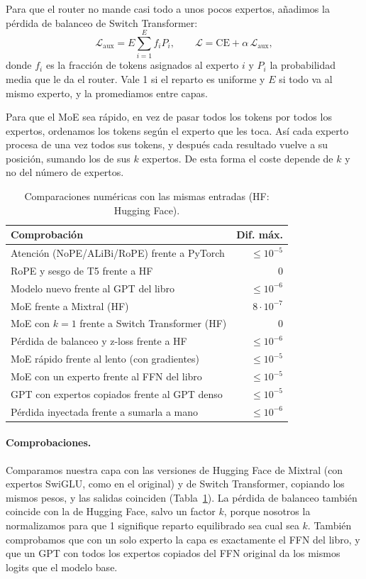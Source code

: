 \documentclass[11pt]{article}
\begin{document}
Para que el router no mande casi todo a unos pocos expertos, añadimos la pérdida de balanceo de Switch Transformer:
\begin{equation}
\mathcal{L}_{\mathrm{aux}} = E \textstyle\sum_{i=1}^{E} f_i P_i,\qquad \mathcal{L} = \mathrm{CE} + \alpha\,\mathcal{L}_{\mathrm{aux}},
\end{equation}
donde $f_i$ es la fracción de tokens asignados al experto $i$ y $P_i$ la probabilidad media que le da el router.
Vale 1 si el reparto es uniforme y $E$ si todo va al mismo experto, y la promediamos entre capas.

Para que el MoE sea rápido, en vez de pasar todos los tokens por todos los expertos, ordenamos los tokens según el experto que les toca.
Así cada experto procesa de una vez todos sus tokens, y después cada resultado vuelve a su posición, sumando los de sus $k$ expertos.
De esta forma el coste depende de $k$ y no del número de expertos.

\begin{table}[t]
\centering\footnotesize\setlength{\tabcolsep}{3pt}
\begin{tabular}{@{}p{6.1cm}r@{}}
\toprule
Comprobación & Dif. máx. \\
\midrule
Atención (NoPE/ALiBi/RoPE) frente a PyTorch & $\le10^{-5}$ \\
RoPE y sesgo de T5 frente a HF & 0 \\
Modelo nuevo frente al GPT del libro & $\le10^{-6}$ \\
MoE frente a Mixtral (HF) & $8\cdot10^{-7}$ \\
MoE con $k{=}1$ frente a Switch Transformer (HF) & 0 \\
Pérdida de balanceo y z-loss frente a HF & $\le10^{-6}$ \\
MoE rápido frente al lento (con gradientes) & $\le10^{-5}$ \\
MoE con un experto frente al FFN del libro & $\le10^{-5}$ \\
GPT con expertos copiados frente al GPT denso & $\le10^{-5}$ \\
Pérdida inyectada frente a sumarla a mano & $\le10^{-6}$ \\
\bottomrule
\end{tabular}
\caption{Comparaciones numéricas con las mismas entradas (HF: Hugging Face).}
\label{tab:val}
\end{table}

\paragraph{Comprobaciones.}
Comparamos nuestra capa con las versiones de Hugging Face de Mixtral (con expertos SwiGLU, como en el original) y de Switch Transformer, copiando los mismos pesos, y las salidas coinciden (Tabla~\ref{tab:val}).
La pérdida de balanceo también coincide con la de Hugging Face, salvo un factor $k$, porque nosotros la normalizamos para que 1 signifique reparto equilibrado sea cual sea $k$.
También comprobamos que con un solo experto la capa es exactamente el FFN del libro, y que un GPT con todos los expertos copiados del FFN original \citep{komatsuzaki2023upcycling} da los mismos logits que el modelo base.
\end{document}
